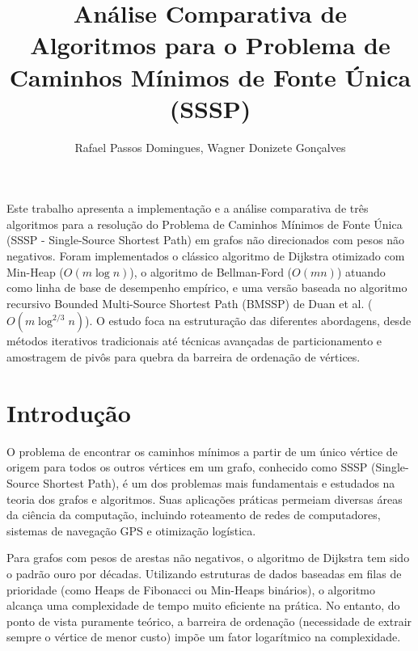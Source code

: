 \documentclass[12pt]{article}
\title{Análise Comparativa de Algoritmos para o Problema de Caminhos Mínimos de Fonte Única (SSSP)}
\author{
    Rafael Passos Domingues\inst{1}, 
    Wagner Donizete Gonçalves\inst{1}
}
\begin{document}
\maketitle

\begin{resumo}
    Este trabalho apresenta a implementação e a análise comparativa de três algoritmos para a resolução do Problema de Caminhos Mínimos de Fonte Única (SSSP - Single-Source Shortest Path) em grafos não direcionados com pesos não negativos. Foram implementados o clássico algoritmo de Dijkstra otimizado com Min-Heap ($O(m \log n)$), o algoritmo de Bellman-Ford ($O(mn)$) atuando como linha de base de desempenho empírico, e uma versão baseada no algoritmo recursivo Bounded Multi-Source Shortest Path (BMSSP) de Duan et al. ($O(m \log^{2/3} n)$). O estudo foca na estruturação das diferentes abordagens, desde métodos iterativos tradicionais até técnicas avançadas de particionamento e amostragem de pivôs para quebra da barreira de ordenação de vértices.
\end{resumo}

\section{Introdução}
\label{sec:introducao}

O problema de encontrar os caminhos mínimos a partir de um único vértice de origem para todos os outros vértices em um grafo, conhecido como SSSP (Single-Source Shortest Path), é um dos problemas mais fundamentais e estudados na teoria dos grafos e algoritmos. Suas aplicações práticas permeiam diversas áreas da ciência da computação, incluindo roteamento de redes de computadores, sistemas de navegação GPS e otimização logística.

Para grafos com pesos de arestas não negativos, o algoritmo de Dijkstra \cite{dijkstra1959note} tem sido o padrão ouro por décadas. Utilizando estruturas de dados baseadas em filas de prioridade (como Heaps de Fibonacci ou Min-Heaps binários), o algoritmo alcança uma complexidade de tempo muito eficiente na prática. No entanto, do ponto de vista puramente teórico, a barreira de ordenação (necessidade de extrair sempre o vértice de menor custo) impõe um fator logarítmico na complexidade.
\end{document}
